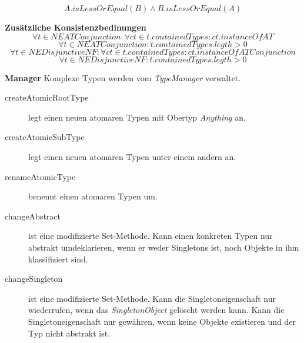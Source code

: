 \[A.isLessOrEqual(B) \land B.isLessOrEqual(A) \]


\textbf{Zusätzliche Konsistenzbedinungen} \newline
\begin{equation}\forall t \in NEATConjunction : 
	\forall ct \in t.containedTypes : ct.instanceOf AT
\end{equation}
\begin{equation}\forall t \in NEATConjunction : 
	t.containedTypes.legth > 0
\end{equation}
\begin{equation}\forall t \in NEDisjunctiveNF : 
	\forall ct \in t.containedTypes : ct.instanceOf ATConjunction
\end{equation}
\begin{equation}\forall t \in NEDisjunctiveNF : 
	t.containedTypes.legth > 0
\end{equation}

\textbf{Manager} \newline
Komplexe Typen werden vom \emph{TypeManager} verwaltet. 

\begin{description}
\item[createAtomicRootType] legt einen neuen atomaren Typen mit Obertyp \emph{Anything} an. 
\item[createAtomicSubType] legt einen neuen atomaren Typen unter einem andern an. 
\item[renameAtomicType] benennt einen atomaren Typen um. 
\item[changeAbstract] ist eine modifizierte Set-Methode. Kann einen konkreten Typen nur abstrakt umdeklarieren, wenn er weder Singletons ist, noch 
Objekte in ihm klassifiziert sind.
\item[changeSingleton] ist eine modifizierte Set-Methode. Kann die Singletoneigenschaft nur wiederrufen, wenn das \emph{SingletonObject} gelöscht werden kann. 
 Kann die Singletoneigenschaft nur gewähren, wenn keine Objekte existieren und der Typ nicht abstrakt ist. 
\end{description}




